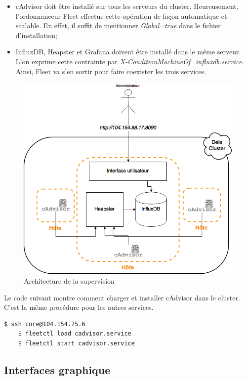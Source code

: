 \begin{onehalfspace}
\begin{itemize}
	\item cAdvisor doit être installé sur tous les serveurs du cluster. Heureusement, l'ordonnanceur Fleet effectue cette opération de façon automatique et scalable. En effet, il suffit de mentionner \emph{Global=true} dans le fichier d'installation;
	\item InfluxDB, Heapster et Grafana doivent être installé dans le même serveur. L'on exprime cette contrainte par \emph{X-ConditionMachineOf=influxdb.service}. Ainsi, Fleet va s'en sortir pour faire coexister les trois services.
\end{itemize}

\begin{figure}[H]
\centering
\includegraphics [scale=0.6]{chapitre5/assets/monitoring-cluster}
\caption{Architecture de la supervision}
\label{fig:}
\end{figure}

Le code suivant montre comment charger et installer cAdvisor dans le cluster. C'est la même procédure pour les autres services.

\begin{lstlisting}[language=bash,caption=Lancement du service cAdvisor]
	$ ssh core@104.154.75.6 
	$ fleetctl load cadvisor.service
	$ fleetctl start cadvisor.service
\end{lstlisting}


\subsection{Interfaces graphique}


\end{onehalfspace}
